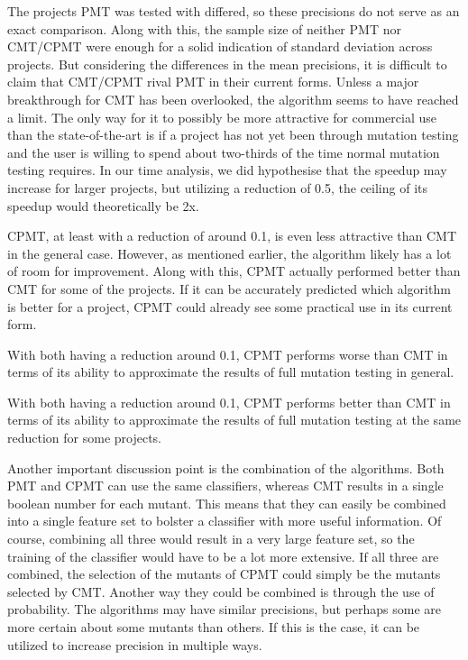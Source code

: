 \documentclass[twoside]{uva-inf-bachelor-thesis}
\begin{document}
The projects PMT was tested with differed, so these precisions do not serve as an exact comparison. Along with this, the sample size of neither PMT nor CMT/CPMT were enough for a solid indication of standard deviation across projects. But considering the differences in the mean precisions, it is difficult to claim that CMT/CPMT rival PMT in their current forms. Unless a major breakthrough for CMT has been overlooked, the algorithm seems to have reached a limit. The only way for it to possibly be more attractive for commercial use than the state-of-the-art is if a project has not yet been through mutation testing and the user is willing to spend about two-thirds of the time normal mutation testing requires. In our time analysis, we did hypothesise that the speedup may increase for larger projects, but utilizing a reduction of 0.5, the ceiling of its speedup would theoretically be 2x.

CPMT, at least with a reduction of around 0.1, is even less attractive than CMT in the general case. However, as mentioned earlier, the algorithm likely has a lot of room for improvement. Along with this, CPMT actually performed better than CMT for some of the projects. If it can be accurately predicted which algorithm is better for a project, CPMT could already see some practical use in its current form.
\begin{finding}
    With both having a reduction around 0.1, CPMT performs worse than CMT in terms of its ability to approximate the results of full mutation testing in general.
\end{finding}
\begin{finding}
    With both having a reduction around 0.1, CPMT performs better than CMT in terms of its ability to approximate the results of full mutation testing at the same reduction for some projects.
\end{finding}

Another important discussion point is the combination of the algorithms. Both PMT and CPMT can use the same classifiers, whereas CMT results in a single boolean number for each mutant. This means that they can easily be combined into a single feature set to bolster a classifier with more useful information. Of course, combining all three would result in a very large feature set, so the training of the classifier would have to be a lot more extensive. If all three are combined, the selection of the mutants of CPMT could simply be the mutants selected by CMT. Another way they could be combined is through the use of probability. The algorithms may have similar precisions, but perhaps some are more certain about some mutants than others. If this is the case, it can be utilized to increase precision in multiple ways.
\end{document}
